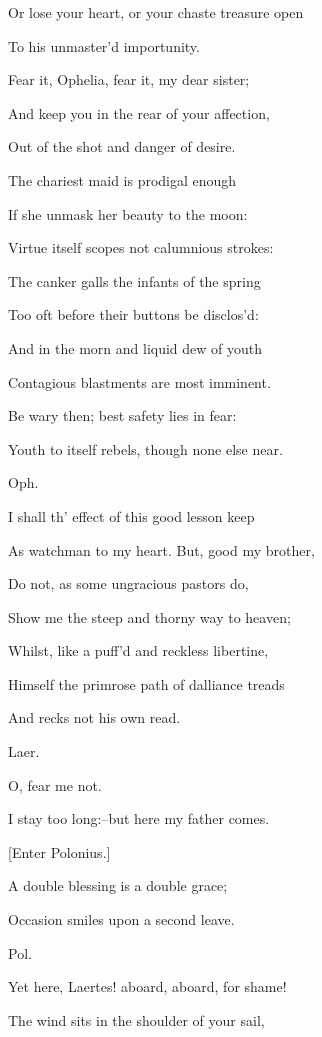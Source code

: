 \documentclass[12pt]{book}
\begin{document}
Or lose your heart, or your chaste treasure open

To his unmaster'd importunity.

Fear it, Ophelia, fear it, my dear sister;

And keep you in the rear of your affection,

Out of the shot and danger of desire.

The chariest maid is prodigal enough

If she unmask her beauty to the moon:

Virtue itself scopes not calumnious strokes:

The canker galls the infants of the spring

Too oft before their buttons be disclos'd:

And in the morn and liquid dew of youth

Contagious blastments are most imminent.

Be wary then; best safety lies in fear:

Youth to itself rebels, though none else near.



Oph.

I shall th' effect of this good lesson keep

As watchman to my heart. But, good my brother,

Do not, as some ungracious pastors do,

Show me the steep and thorny way to heaven;

Whilst, like a puff'd and reckless libertine,

Himself the primrose path of dalliance treads

And recks not his own read.



Laer.

O, fear me not.

I stay too long:--but here my father comes.



[Enter Polonius.]



A double blessing is a double grace;

Occasion smiles upon a second leave.



Pol.

Yet here, Laertes! aboard, aboard, for shame!

The wind sits in the shoulder of your sail,
\end{document}
